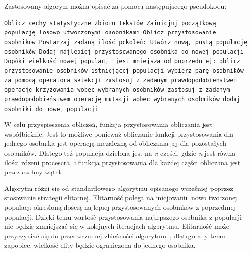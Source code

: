 \documentclass[brudnopis]{xmgr}
\begin{document}
Zastosowany algorym można opisać za pomocą następującego pseudokodu:\newline

\noindent
\texttt{Oblicz cechy statystyczne zbioru tekstów\newline
Zainicjuj początkową populację losowo utworzonymi osobnikami\newline
Oblicz przystosowanie osobników\newline
Powtarzaj zadaną ilość pokoleń:\newline
\indent Utwórz nową, pustą populację osobników\newline
\indent Dodaj najlepiej przystosowanego osobnika do nowej populacji\newline
\indent Dopóki wielkość nowej populacji jest mniejsza od poprzedniej:\newline
\indent\indent oblicz przystosowanie osobników istniejącej populacji\newline
\indent\indent wybierz parę osobników za pomocą operatora selekcji\newline
\indent\indent zastosuj z zadanym prawdopodobieństwem operację krzyżowania\newline
\indent\indent wobec wybranych osobników\newline
\indent\indent zastosuj z zadanym prawdopodobieństwem operację mutacji\newline
\indent\indent wobec wybranych osobników\newline
\indent\indent dodaj osobniki do nowej populacji\newline
}

W celu przyspieszenia obliczeń, funkcja przystosowania obliczania jest współbieżnie. Jest to możliwe ponieważ obliczanie funkcji przystosowania dla jednego osobnika jest operacją niezależną od obliczania jej dla pozostałych osobników. Dlatego też populacja dzielona jest na \emph{n} części, gdzie \emph{n} jest równa ilości rdzeni procesora, i funkcja przystosowania dla każdej części obliczana jest przez osobny wątek.

Algorytm różni się od standardowego algorytmu opisanego wcześniej poprzez stosowanie strategii elitarnej. Elitarność polega na inicjowaniu nowo tworzonej populacji określoną ilością najlepiej przystosowanych osobników z poprzedniej populacji. Dzięki temu wartość przystosowania najlepszego osobnika z populacji nie będzie zmniejszać się w kolejnych iteracjach algorytmu. Elitarność może przyczyniać się do przedwczesnej zbieżności algorytmu~\cite{Luke2009Metaheuristics}, dlatego aby temu zapobiec, wielkość elity będzie ograniczona do jednego osobnika.
\end{document}
